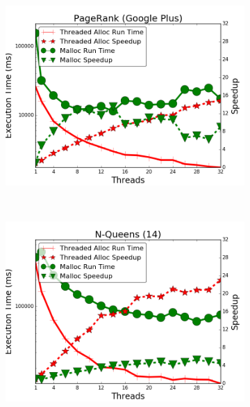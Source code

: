 \begin{figure}[h]
\begin{subfigure}[b]{\smallplotsize\textwidth}
                \includegraphics[width=\textwidth]{experiments/scalability/malloc-allocator-pagerank-gplus.png}
                \label{fig:implementation:malloc_pagerank}
        \end{subfigure}
        ~
        \begin{subfigure}[b]{\smallplotsize\textwidth}
                \includegraphics[width=\textwidth]{experiments/scalability/malloc-allocator-8queens-14.png}
                \label{fig:implementation:malloc_queens}
        \end{subfigure} \\


        \label{fig:implementation:malloc_results}
\end{figure}
